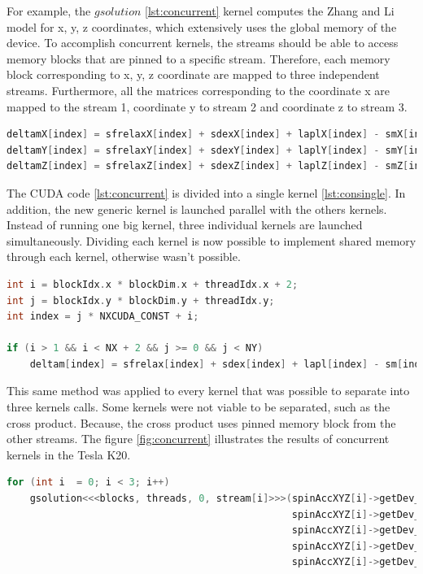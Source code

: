 For example, the $gsolution$ \ref{lst:concurrent} kernel computes the Zhang and Li model for x, y, z coordinates, which extensively uses the global memory of the device. To accomplish concurrent kernels, the streams should be able to access memory blocks that are pinned to a specific stream. Therefore, each memory block corresponding to x, y, z coordinate are mapped to three independent streams. Furthermore, all the matrices corresponding to the coordinate x are mapped to the stream 1, coordinate y to stream 2 and coordinate z to stream 3.

\begin{lstlisting}[language=C++, label={lst:concurrent}, caption={Evaluation of x, y, z coordinates of the Zhang and Li model in a single kernel.}]
deltamX[index] = sfrelaxX[index] + sdexX[index] + laplX[index] - smX[index];
deltamY[index] = sfrelaxY[index] + sdexY[index] + laplY[index] - smY[index];
deltamZ[index] = sfrelaxZ[index] + sdexZ[index] + laplZ[index] - smZ[index];
\end{lstlisting}
 
The CUDA code \ref{lst:concurrent} is divided into a single kernel \ref{lst:consingle}. In addition, the new generic kernel is launched parallel with the others kernels. Instead of running one big kernel, three individual kernels are launched simultaneously. Dividing each kernel is now possible to implement shared memory through each kernel, otherwise wasn't possible. 

\begin{lstlisting}[language=C++, label={lst:consingle}, caption={Evaluation of individual coordinates of the Zhang and Li model}]
int i = blockIdx.x * blockDim.x + threadIdx.x + 2;
int j = blockIdx.y * blockDim.y + threadIdx.y;
int index = j * NXCUDA_CONST + i;

if (i > 1 && i < NX + 2 && j >= 0 && j < NY)
	deltam[index] = sfrelax[index] + sdex[index] + lapl[index] - sm[index];
\end{lstlisting}

This same method was applied to every kernel that was possible to separate into three kernels calls. Some kernels were not viable to be separated, such as the cross product. Because, the cross product uses pinned memory block from the other streams. The figure \ref{fig:concurrent} illustrates the results of concurrent kernels in the Tesla K20.

\begin{lstlisting}[language=C++, caption={Evaluate Zhang and Li model.}]
for (int i  = 0; i < 3; i++)
	gsolution<<<blocks, threads, 0, stream[i]>>>(spinAccXYZ[i]->getDev_deltam(),
												 spinAccXYZ[i]->getDev_sfrelax(), 
												 spinAccXYZ[i]->getDev_sm(), 
											 	 spinAccXYZ[i]->getDev_sdex(),
											 	 spinAccXYZ[i]->getDev_lapl());
\end{lstlisting}

